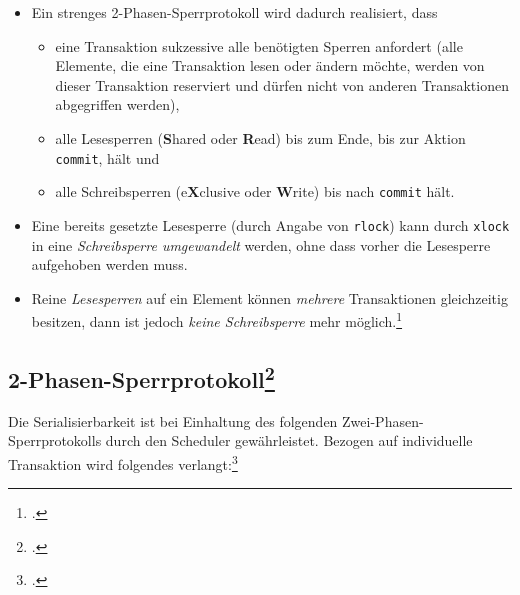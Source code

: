 \documentclass{lehramt-informatik-haupt}
\begin{document}
\begin{itemize}
\item Ein strenges 2-Phasen-Sperrprotokoll wird dadurch realisiert, dass

\begin{itemize}
\item eine Transaktion sukzessive alle benötigten Sperren anfordert
(alle Elemente, die eine Transaktion lesen oder ändern möchte, werden
von dieser Transaktion reserviert und dürfen nicht von anderen
Transaktionen abgegriffen werden),

\item alle Lesesperren (\textbf{S}hared oder \textbf{R}ead) bis zum
Ende, \dh bis zur Aktion \texttt{commit}, hält und

\item alle Schreibsperren (e\textbf{X}clusive oder \textbf{W}rite) bis
nach \texttt{commit} hält.
\end{itemize}

\item Eine bereits gesetzte Lesesperre (durch Angabe von \texttt{rlock})
kann durch \texttt{xlock} in eine \emph{Schreibsperre umgewandelt}
werden, ohne dass vorher die Lesesperre aufgehoben werden muss.

\item Reine \emph{Lesesperren} auf ein Element können \emph{mehrere}
Transaktionen gleichzeitig besitzen, dann ist jedoch \emph{keine
Schreibsperre} mehr möglich.\footcite[11.6.2 Zwei-Phasen-Sperrprotokoll, Seite 346]{kemper}
\end{itemize}

%

\subsection{2-Phasen-Sperrprotokoll\footcite[Seite 16]{db:fs:5}}

Die Serialisierbarkeit ist bei Einhaltung des folgenden
Zwei-Phasen-Sperrprotokolls durch den Scheduler gewährleistet. Bezogen
auf individuelle Transaktion wird folgendes verlangt:\footcite{wiki:sperrverfahren}
\end{document}
